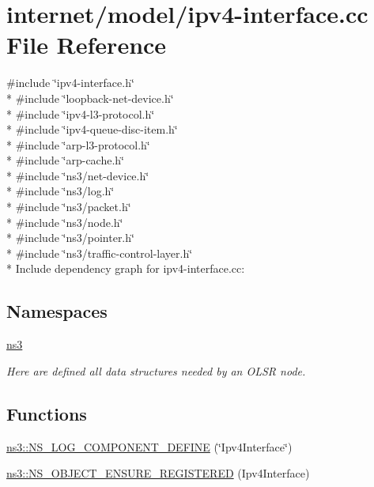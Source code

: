 \hypertarget{ipv4-interface_8cc}{}\section{internet/model/ipv4-\/interface.cc File Reference}
\label{ipv4-interface_8cc}
{\ttfamily \#include \char`\"{}ipv4-\/interface.\+h\char`\"{}}\\*
{\ttfamily \#include \char`\"{}loopback-\/net-\/device.\+h\char`\"{}}\\*
{\ttfamily \#include \char`\"{}ipv4-\/l3-\/protocol.\+h\char`\"{}}\\*
{\ttfamily \#include \char`\"{}ipv4-\/queue-\/disc-\/item.\+h\char`\"{}}\\*
{\ttfamily \#include \char`\"{}arp-\/l3-\/protocol.\+h\char`\"{}}\\*
{\ttfamily \#include \char`\"{}arp-\/cache.\+h\char`\"{}}\\*
{\ttfamily \#include \char`\"{}ns3/net-\/device.\+h\char`\"{}}\\*
{\ttfamily \#include \char`\"{}ns3/log.\+h\char`\"{}}\\*
{\ttfamily \#include \char`\"{}ns3/packet.\+h\char`\"{}}\\*
{\ttfamily \#include \char`\"{}ns3/node.\+h\char`\"{}}\\*
{\ttfamily \#include \char`\"{}ns3/pointer.\+h\char`\"{}}\\*
{\ttfamily \#include \char`\"{}ns3/traffic-\/control-\/layer.\+h\char`\"{}}\\*
Include dependency graph for ipv4-\/interface.cc\+:
\subsection*{Namespaces}
\begin{DoxyCompactItemize}
\item 
 \hyperlink{namespacens3}{ns3}
\begin{DoxyCompactList}\small\item\em Here are defined all data structures needed by an O\+L\+SR node. \end{DoxyCompactList}\end{DoxyCompactItemize}
\subsection*{Functions}
\begin{DoxyCompactItemize}
\item 
\hyperlink{namespacens3_a3792b3de9e0b9df68607872bf3476e38}{ns3\+::\+N\+S\+\_\+\+L\+O\+G\+\_\+\+C\+O\+M\+P\+O\+N\+E\+N\+T\+\_\+\+D\+E\+F\+I\+NE} (\char`\"{}Ipv4\+Interface\char`\"{})
\item 
\hyperlink{namespacens3_a6caf1dd00876f5dd7ead2ca517b917d9}{ns3\+::\+N\+S\+\_\+\+O\+B\+J\+E\+C\+T\+\_\+\+E\+N\+S\+U\+R\+E\+\_\+\+R\+E\+G\+I\+S\+T\+E\+R\+ED} (Ipv4\+Interface)
\end{DoxyCompactItemize}
